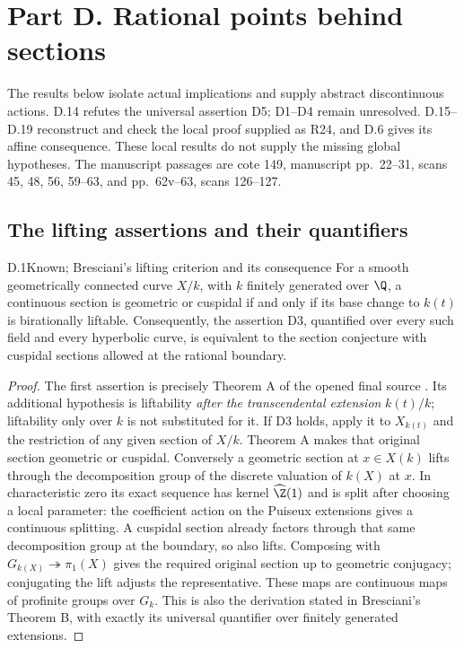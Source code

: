 \section{Part D. Rational points behind sections}
\label{sec:partD}

The results below isolate actual implications and supply abstract
discontinuous actions. D.14 refutes the universal assertion D5;
D1--D4 remain unresolved. D.15--D.19 reconstruct and check the
local proof supplied as R24, and D.6 gives its affine consequence.
These local results do not supply the missing global hypotheses.
The manuscript passages are cote 149, manuscript pp.~22--31,
scans 45, 48, 56, 59--63, and pp.~62v--63, scans 126--127.

\subsection{The lifting assertions and their quantifiers}

\begin{claim}{D.1}{Known; Bresciani's lifting criterion and its consequence}
For a smooth geometrically connected curve $X/k$, with $k$ finitely
generated over $\Q$, a continuous section is geometric or cuspidal
if and only if its base change to $k(t)$ is birationally liftable.
Consequently, the assertion D3, quantified over every such field and
every hyperbolic curve, is equivalent to the section conjecture with
cuspidal sections allowed at the rational boundary.
\end{claim}
\begin{proof}
The first assertion is precisely Theorem A of the opened final source
\citet{D_Bresciani2023}. Its additional hypothesis is liftability
\emph{after the transcendental extension} $k(t)/k$; liftability only
over $k$ is not substituted for it.
If D3 holds, apply it to $X_{k(t)}$ and the restriction of any given
section of $X/k$. Theorem A makes that original section geometric or
cuspidal. Conversely a geometric section at $x\in X(k)$ lifts through
the decomposition group of the discrete valuation of $k(X)$ at $x$.
In characteristic zero its exact sequence has kernel
$\widehat{\Z}(1)$ and is split after choosing a local parameter:
the coefficient action on the Puiseux extensions gives a continuous
splitting. A cuspidal section already factors through that same
decomposition group at the boundary, so also lifts. Composing with
$G_{k(X)}\twoheadrightarrow\pi_1(X)$ gives the required original
section up to geometric conjugacy; conjugating the lift adjusts the
representative. These maps are continuous maps of profinite groups
over $G_k$. This is also the derivation stated in Bresciani's
Theorem B, with exactly its universal quantifier over finitely
generated extensions.
\end{proof}

